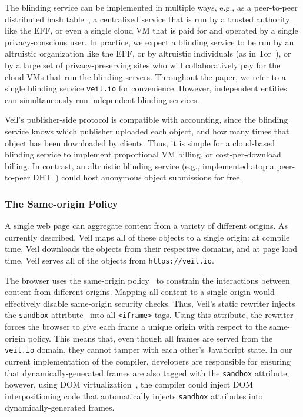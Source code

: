 The blinding service can be implemented
in multiple ways, e.g., as a peer-to-peer
distributed hash table~\cite{pastry,chord},
a centralized service that is run by a
trusted authority like the EFF,
or even a single cloud VM that is paid for and
operated by a single privacy-conscious user. In
practice, we expect a blinding service to be run
by an altruistic organization like the EFF, or by
altruistic individuals (as in Tor~\cite{tor}),
or by a large set of privacy-preserving
sites who will collaboratively pay for the cloud
VMs that run the blinding servers. Throughout the
paper, we refer to a single blinding service
\texttt{veil.io} for convenience.
However, independent entities can simultaneously
run independent blinding services.

Veil's publisher-side protocol is compatible
with accounting, since the blinding service knows
which publisher uploaded each object, and how many
times that object has been downloaded by clients.
Thus, it is simple for a cloud-based blinding service
to implement proportional VM billing, or cost-per-download
billing. In contrast, an altruistic blinding service
(e.g., implemented atop a peer-to-peer DHT~\cite{pastry,chord})
could host anonymous object submissions for free.

\subsubsection{The Same-origin Policy}
\label{sec:sop}

A single web page can aggregate content from a
variety of different origins. As currently
described, Veil maps all of these objects to
a single origin: at compile time, Veil downloads
the objects from their respective domains, and
at page load time, Veil serves all of the
objects from \texttt{https://veil.io}.

The browser uses the same-origin policy~\cite{sop}
to constrain the interactions between content
from different origins. Mapping all content to
a single origin would effectively disable
same-origin security checks. Thus, Veil's static
rewriter injects the \texttt{sandbox} attribute~\cite{iframeSandbox}
into all \texttt{<iframe>} tags. Using this
attribute, the rewriter forces the browser
to give each frame a unique origin with respect
to the same-origin policy. This means that,
even though all frames are served from the
\texttt{veil.io} domain, they cannot tamper
with each other's JavaScript state. In our current
implementation of the compiler, developers are
responsible for ensuring that dynamically-generated
frames are also tagged with the \texttt{sandbox}
attribute; however, using DOM virtualization~\cite{treehouse,mugshot},
the compiler could inject DOM interpositioning
code that automatically injects \texttt{sandbox}
attributes into dynamically-generated frames.

